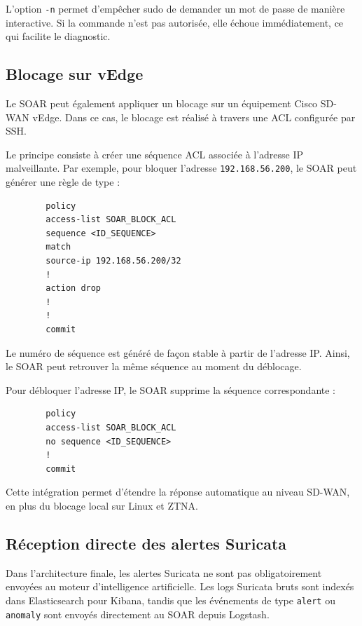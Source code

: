 \documentclass[12pt,a4paper,oneside]{report}
\begin{document}
    L'option \texttt{-n} permet d'empêcher sudo de demander un mot de passe de manière interactive. Si la commande n'est pas autorisée, elle échoue immédiatement, ce qui facilite le diagnostic.
    
    \subsection{Blocage sur vEdge}
    
    Le SOAR peut également appliquer un blocage sur un équipement Cisco SD-WAN vEdge. Dans ce cas, le blocage est réalisé à travers une ACL configurée par SSH.
    
    Le principe consiste à créer une séquence ACL associée à l'adresse IP malveillante. Par exemple, pour bloquer l'adresse \texttt{192.168.56.200}, le SOAR peut générer une règle de type :
    
    \begin{lstlisting}
    	policy
    	access-list SOAR_BLOCK_ACL
    	sequence <ID_SEQUENCE>
    	match
    	source-ip 192.168.56.200/32
    	!
    	action drop
    	!
    	!
    	commit
    \end{lstlisting}
    
    Le numéro de séquence est généré de façon stable à partir de l'adresse IP. Ainsi, le SOAR peut retrouver la même séquence au moment du déblocage.
    
    Pour débloquer l'adresse IP, le SOAR supprime la séquence correspondante :
    
    \begin{lstlisting}
    	policy
    	access-list SOAR_BLOCK_ACL
    	no sequence <ID_SEQUENCE>
    	!
    	commit
    \end{lstlisting}
    
    Cette intégration permet d'étendre la réponse automatique au niveau SD-WAN, en plus du blocage local sur Linux et ZTNA.
    
    \subsection{Réception directe des alertes Suricata}
    
    Dans l'architecture finale, les alertes Suricata ne sont pas obligatoirement envoyées au moteur d'intelligence artificielle. Les logs Suricata bruts sont indexés dans Elasticsearch pour Kibana, tandis que les événements de type \texttt{alert} ou \texttt{anomaly} sont envoyés directement au SOAR depuis Logstash.
    
\end{document}
